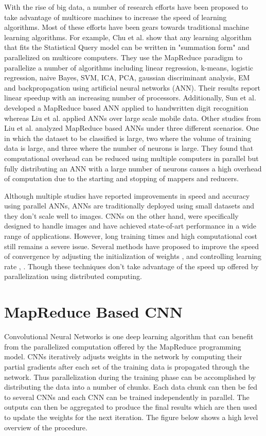 \documentclass[12pt]{report}
\begin{document}
With the rise of big data, a number of research efforts have been proposed to take advantage of multicore machines to increase the speed of learning algorithms. Most of these efforts have been gears towards traditional machine learning algorithms. For example, Chu et al. \cite{multicore} show that any learning algorithm that fits the Statistical Query model \cite{statisticalQuery} can be written in "summation form" and parallelized on multicore computers.  They use the MapReduce paradigm to parallelize a number of algorithms including linear regression, k-means, logistic regression, naive Bayes, SVM, ICA, PCA, gaussian discriminant analysis, EM and backpropagation using artificial neural networks (ANN).  Their results report linear speedup with an increasing number of processors. Additionally, Sun et al. \cite{MRNN2} developed a MapReduce based ANN applied to handwritten digit recognition whereas Liu et al. applied ANNs over large scale mobile data. \cite{MRNN3} Other studies from Liu et al. \cite{MRNN1} analyzed MapReduce based ANNs under three different scenarios. One in which the dataset to be classified is large, two where the volume of training data is large, and three where the number of neurons is large.  They found that computational overhead can be reduced using multiple computers in parallel but fully distributing an ANN with a large number of neurons causes a high overhead of computation due to the starting and stopping of mappers and reducers.

Although multiple studies have reported improvements in speed and accuracy using parallel ANNs, ANNs are traditionally deployed using small datasets and they don't scale well to images. CNNs on the other hand, were specifically designed to handle images and have achieved state-of-art performance in a wide range of applications. However, long training times and high computational cost still remains a severe issue. Several methods have proposed to improve the speed of convergence by adjusting the initialization of weights \cite{Glorot}, \cite{adaptiveWeights} and controlling learning rate \cite{Adam}, \cite{Momentum}. Though these techniques don't take advantage of the speed up offered by parallelization using distributed computing. 

\section{MapReduce Based CNN}

Convolutional Neural Networks is one deep learning algorithm that can benefit from the parallelized computation offered by the MapReduce programming model. CNNs iteratively adjusts weights in the network by computing their partial gradients after each set of the training data is propagated through the network.  Thus parallelization during the training phase can be accomplished by distributing the data into a number of chunks. Each data chunk can then be fed to several CNNs and each CNN can be trained independently in parallel. The outputs can then be aggregated to produce the final results which are then used to update the weights for the next iteration. The figure below shows a high level overview of the procedure.
\end{document}
